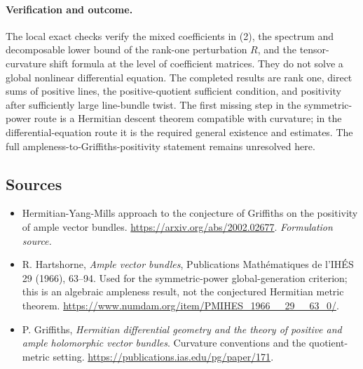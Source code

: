 \documentclass[11pt]{article}
\begin{document}
\paragraph{Verification and outcome.}
The local exact checks verify the mixed coefficients in (2), the spectrum and decomposable lower bound of the rank-one perturbation $R$, and the tensor-curvature shift formula at the level of coefficient matrices. They do not solve a global nonlinear differential equation. The completed results are rank one, direct sums of positive lines, the positive-quotient sufficient condition, and positivity after sufficiently large line-bundle twist. The first missing step in the symmetric-power route is a Hermitian descent theorem compatible with curvature; in the differential-equation route it is the required general existence and estimates. The full ampleness-to-Griffiths-positivity statement remains unresolved here.

\subsection{Sources}
\begin{itemize}
\item[S1]Hermitian-Yang-Mills approach to the conjecture of Griffiths on the positivity of ample vector bundles.
\url{https://arxiv.org/abs/2002.02677}.
\textit{Formulation source.}
\item[E1]R. Hartshorne, \textit{Ample vector bundles}, Publications Math\'ematiques de l'IH\'ES 29 (1966), 63--94. Used for the symmetric-power global-generation criterion; this is an algebraic ampleness result, not the conjectured Hermitian metric theorem.
\url{https://www.numdam.org/item/PMIHES_1966__29__63_0/}.
\item[E2]P. Griffiths, \textit{Hermitian differential geometry and the theory of positive and ample holomorphic vector bundles}. Curvature conventions and the quotient-metric setting.
\url{https://publications.ias.edu/pg/paper/171}.

\end{itemize}
\end{document}
